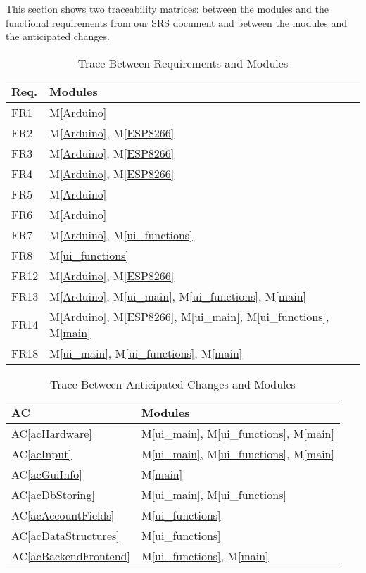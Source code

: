\documentclass[12pt, titlepage]{article}
\newcommand{\acref}[1]{AC\ref{#1}}
\newcommand{\mref}[1]{M\ref{#1}}
\begin{document}
This section shows two traceability matrices: between the modules and the
functional requirements from our SRS document and between the modules and the anticipated changes.


\begin{table}[H]
\centering
\begin{tabular}{p{} p{}}
\toprule
\textbf{Req.} & \textbf{Modules}\\
\midrule
FR1 & \mref{Arduino}\\
FR2 & \mref{Arduino}, \mref{ESP8266}\\
FR3 & \mref{Arduino}, \mref{ESP8266}\\
FR4 & \mref{Arduino}, \mref{ESP8266}\\
FR5 & \mref{Arduino}\\
FR6 & \mref{Arduino}\\
FR7 & \mref{Arduino}, \mref{ui_functions}\\
FR8 & \mref{ui_functions}\\
FR12 & \mref{Arduino}, \mref{ESP8266}\\
FR13 & \mref{Arduino}, \mref{ui_main}, \mref{ui_functions}, \mref{main}\\
FR14 & \mref{Arduino}, \mref{ESP8266}, \mref{ui_main}, \mref{ui_functions}, \mref{main}\\
FR18 & \mref{ui_main}, \mref{ui_functions}, \mref{main}\\
\bottomrule
\end{tabular}
\caption{Trace Between Requirements and Modules}
\label{TblRT}
\end{table}

\begin{table}[H]
\centering
\begin{tabular}{p{} p{}}
\toprule
\textbf{AC} & \textbf{Modules}\\
\midrule
\acref{acHardware} & \mref{ui_main}, \mref{ui_functions}, \mref{main}\\
\acref{acInput} & \mref{ui_main}, \mref{ui_functions}, \mref{main}\\
\acref{acGuiInfo} & \mref{main}\\
\acref{acDbStoring} & \mref{ui_main}, \mref{ui_functions}\\
\acref{acAccountFields} & \mref{ui_functions}\\
\acref{acDataStructures} & \mref{ui_functions}\\
\acref{acBackendFrontend} & \mref{ui_functions}, \mref{main}\\

\bottomrule
\end{tabular}
\caption{Trace Between Anticipated Changes and Modules}
\label{TblACT}
\end{table}

\newpage{}
\end{document}
